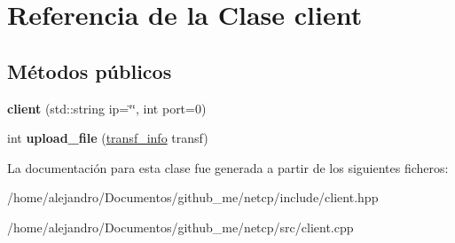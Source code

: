 \hypertarget{classclient}{}\section{Referencia de la Clase client}
\label{classclient}
\subsection*{Métodos públicos}
\begin{DoxyCompactItemize}
\item 
\mbox{\label{classclient_ad6d60f584e78a52b5fefcb5c4a50bd76}} 
{\bfseries client} (std\+::string ip=\char`\"{}\char`\"{}, int port=0)
\item 
\mbox{\label{classclient_ad95e87b6c247313d2ebc2976a3d25117}} 
int {\bfseries upload\+\_\+file} (\hyperlink{structtransf__info}{transf\+\_\+info} transf)
\end{DoxyCompactItemize}


La documentación para esta clase fue generada a partir de los siguientes ficheros\+:\begin{DoxyCompactItemize}
\item 
/home/alejandro/\+Documentos/github\+\_\+me/netcp/include/client.\+hpp\item 
/home/alejandro/\+Documentos/github\+\_\+me/netcp/src/client.\+cpp\end{DoxyCompactItemize}

